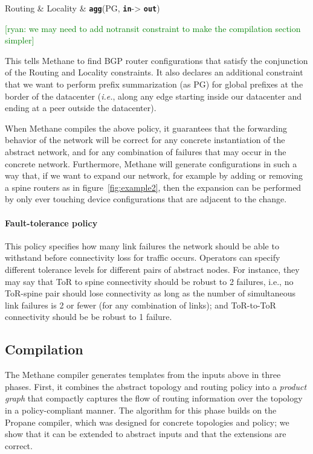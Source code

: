 \documentclass[numbers, 10pt, preprint]{sigplanconf}
\newcommand{\ryan}[1]{\textcolor{green}{[ryan: #1]}}
\newcommand{\IE}{\emph{i.e.}}
\newcommand{\sysname}{{\small \sf Methane}\xspace}
\newcommand{\para}[1]{\paragraph*{\textbf{#1}}}
\newcommand{\KW}[1]{\texttt{\small\bfseries{#1}}}
\newcommand{\Agg}{\KW{agg}}
\newcommand{\In}{\KW{in}}
\newcommand{\Out}{\KW{out}}
\begin{document}
\begin{code}
Routing & Locality & \Agg(PG, \In -> \Out)
\end{code}
\noindent%

\ryan{we may need to add notransit constraint to make the compilation section simpler}

This tells \sysname to find BGP router configurations that satisfy the conjunction of the Routing and Locality constraints. It also declares an additional constraint that we want to perform prefix summarization (as PG) for global prefixes at the border of the datacenter (\IE, along any edge starting inside our datacenter and ending at a peer outside the datacenter).

When \sysname compiles the above policy, it guarantees that the forwarding behavior of the network will be correct for any concrete instantiation of the abstract network, and for any combination of failures that may occur in the concrete network. Furthermore, \sysname will generate configurations in such a way that, if we want to expand our network, for example by adding or removing a spine routers as in figure~\ref{fig:example2}, then the expansion can be performed by only ever touching device configurations that are adjacent to the change.

\para{Fault-tolerance policy} This policy specifies how many link failures the network should be able to withstand before connectivity loss for traffic occurs. Operators can  specify different tolerance levels for different pairs of abstract nodes. For instance, they may say that ToR to spine connectivity should be robust to 2 failures, i.e., no ToR-spine pair should lose connectivity as long as the number of simultaneous link failures is 2 or fewer (for any combination of links); and ToR-to-ToR connectivity should be be robust to 1 failure.


\subsection{Compilation}


The \sysname compiler generates templates from the inputs above in three phases. First, it combines the abstract topology and routing policy into a {\em product graph} that compactly captures the flow of routing information over the topology in a policy-compliant manner. The algorithm for this phase builds on the Propane compiler, which was designed for concrete topologies and policy; we show that it can be extended to abstract inputs and that the extensions are correct. 
\end{document}

